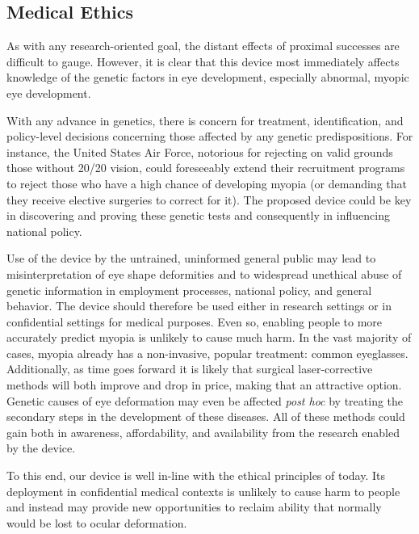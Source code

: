 \documentclass{article}
\begin{document}
 
\subsection{Medical Ethics}
\label{sec:blah-blah-blah}
 

As with any research-oriented goal, the distant effects of proximal
successes are difficult to gauge. However, it is clear that this
device most immediately affects knowledge of the genetic factors in
eye development, especially abnormal, myopic eye development.

With any advance in genetics, there is concern for treatment,
identification, and policy-level decisions concerning those affected
by any genetic predispositions. For instance, the United States Air
Force, notorious for rejecting on valid grounds those without 20/20
vision, could foreseeably extend their recruitment programs to reject
those who have a high chance of developing myopia (or demanding that
they receive elective surgeries to correct for it). The proposed
device could be key in discovering and proving these genetic tests and
consequently in influencing national policy.

Use of the device by the untrained, uninformed general public may lead
to misinterpretation of eye shape deformities and to widespread
unethical abuse of genetic information in employment processes,
national policy, and general behavior. The device should therefore be
used either in research settings or in confidential settings for
medical purposes.  Even so, enabling people to more accurately predict
myopia is unlikely to cause much harm.  In the vast majority of cases,
myopia already has a non-invasive, popular treatment: common
eyeglasses. Additionally, as time goes forward it is likely that
surgical laser-corrective methods will both improve and drop in price,
making that an attractive option. Genetic causes of eye deformation
may even be affected \textit{post hoc} by treating the secondary steps
in the development of these diseases. All of these methods could gain
both in awareness, affordability, and availability from the research
enabled by the device.
 
To this end, our device is well in-line with the ethical principles of
today. Its deployment in confidential medical contexts is unlikely to
cause harm to people and instead may provide new opportunities to
reclaim ability that normally would be lost to ocular deformation.
 
\end{document}
